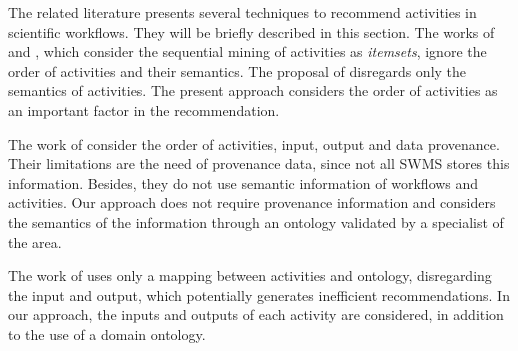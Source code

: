 \documentclass[10pt,letterpaper]{article}
\begin{document}
%
%
%

The related literature presents several techniques to recommend activities in scientific workflows. They will be briefly described in this section. The works of  and , which consider the sequential mining of activities as \emph{itemsets}, ignore the order of activities and their semantics. The proposal of  disregards only the semantics of activities. The present approach considers the order of activities as an important factor in the recommendation.

The work of  consider the order of activities, input, output and data provenance. Their limitations are the need of provenance data, since not all SWMS stores this information. Besides, they do not use semantic information of workflows and activities. Our approach does not require provenance information and considers the semantics of the information through an ontology validated by a specialist of the area.

The work of  uses only a mapping between activities and ontology, disregarding the input and output, which potentially generates inefficient recommendations. In our approach, the inputs and outputs of each activity are considered, in addition to the use of a domain ontology.
\end{document}
